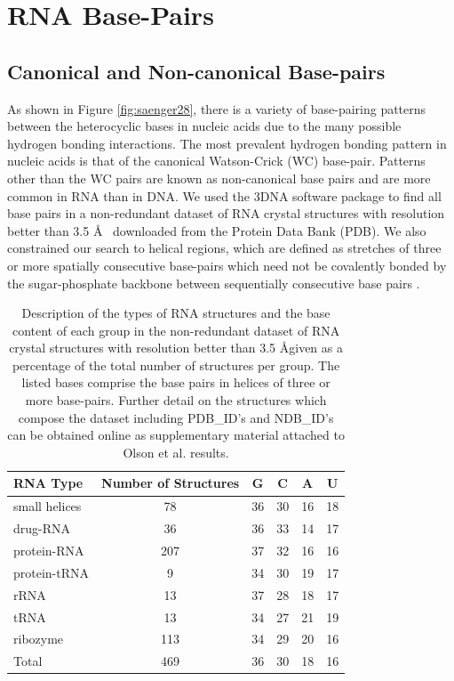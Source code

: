 \chapter{RNA Base-Pairs}
\label{basepairs} 

\section{Canonical and Non-canonical Base-pairs}
As  shown  in  Figure  \ref{fig:saenger28},  there  is  a  variety  of
base-pairing patterns between the  heterocyclic bases in nucleic acids
due  to the  many possible  hydrogen bonding  interactions.   The most
prevalent hydrogen  bonding pattern  in nucleic acids  is that  of the
canonical  Watson-Crick (WC)  base-pair.  Patterns  other than  the WC
pairs are known as non-canonical base pairs and are more common in RNA
than in DNA.  We used  the 3DNA \cite{lu2003} software package to find
all base  pairs in a  non-redundant dataset of RNA  crystal structures
with resolution better than 3.5  \AA~ downloaded from the Protein Data
Bank (PDB).  We also constrained  our search to helical regions, which
are  defined  as stretches  of  three  or  more spatially  consecutive
base-pairs which need not  be covalently bonded by the sugar-phosphate
backbone between sequentially consecutive base pairs \cite{olson2009}.

\begin{table}[htbp]
\begin{center}
\begin{tabular}{|l|c|r|r|r|r|}
\hline
RNA Type & \multicolumn{1}{p{2cm}|}{Number of Structures} & \multicolumn{1}{c|}{G} &
\multicolumn{1}{c|}{C} & \multicolumn{1}{c|}{A} &
\multicolumn{1}{c|}{U} \\ \hline 
small helices & 78 & 36 & 30 & 16 & 18 \\ \hline
drug-RNA & 36 & 36 & 33 & 14 & 17 \\ \hline
protein-RNA & 207 & 37 & 32 & 16 & 16 \\ \hline
protein-tRNA & 9 & 34 & 30 & 19 & 17 \\ \hline
rRNA & 13 & 37 & 28 & 18 & 17 \\ \hline
tRNA & 13 & 34 & 27 & 21 & 19 \\ \hline
ribozyme & 113 & 34 & 29 & 20 & 16 \\ \hline
Total & 469 & \multicolumn{1}{c|}{36} & \multicolumn{1}{c|}{30} & \multicolumn{1}{c|}{18} & \multicolumn{1}{c|}{16} \\ \hline
\end{tabular}
\caption{Description  of the  types  of RNA  structures  and the  base
  content of  each group in  the non-redundant dataset of  RNA crystal
  structures with resolution better than 3.5 \AA given as a percentage
  of  the total  number of  structures  per group.   The listed  bases
  comprise  the base  pairs in  helices of  three or  more base-pairs.
  Further detail on the structures which compose the dataset including
  PDB\_ID's  and NDB\_ID's  can  be obtained  online as  supplementary
  material attached to Olson et al. \cite{olson2009} results.}
\label{tab:dbase}
\end{center}
\end{table}


